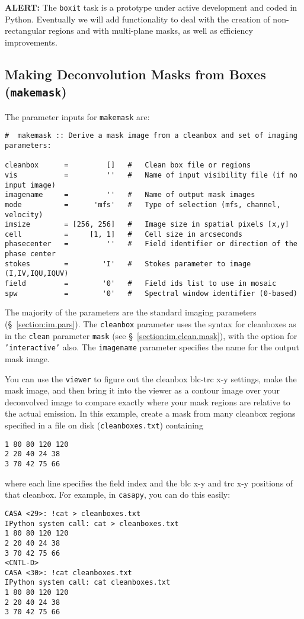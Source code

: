 {\bf ALERT:} The {\tt boxit} task is a prototype under active development and
coded in Python. Eventually we will add functionality to deal with the creation of
non-rectangular regions and with multi-plane masks, as well as efficiency
improvements.  %

\subsection{Making Deconvolution Masks from Boxes ({\tt makemask})}
\label{section:im.mask.makemask}

The parameter inputs for {\tt makemask} are:
\small
\begin{verbatim}
#  makemask :: Derive a mask image from a cleanbox and set of imaging parameters:

cleanbox      =         []   #   Clean box file or regions
vis           =         ''   #   Name of input visibility file (if no input image)
imagename     =         ''   #   Name of output mask images
mode          =      'mfs'   #   Type of selection (mfs, channel, velocity)
imsize        = [256, 256]   #   Image size in spatial pixels [x,y]
cell          =     [1, 1]   #   Cell size in arcseconds
phasecenter   =         ''   #   Field identifier or direction of the phase center
stokes        =        'I'   #   Stokes parameter to image (I,IV,IQU,IQUV)
field         =        '0'   #   Field ids list to use in mosaic
spw           =        '0'   #   Spectral window identifier (0-based)
\end{verbatim}
\normalsize 
The majority of the parameters are the standard imaging parameters
(\S~\ref{section:im.pars}).  The {\tt cleanbox} parameter uses the
syntax for cleanboxes as in the {\tt clean} parameter {\tt mask} (see
\S~\ref{section:im.clean.mask}), with the option for {\tt 'interactive'}
also.  The {\tt imagename} parameter specifies the name
for the output mask image.

You can use the {\tt viewer} to figure out the cleanbox blc-trc x-y
settings, make the mask image, and then bring it into the viewer as a
contour image over your deconvolved image to compare exactly where
your mask regions are relative to the actual emission.  In this
example, create a mask from many cleanbox regions specified in a file
on disk ({\tt cleanboxes.txt}) containing
\small
\begin{verbatim}
1 80 80 120 120
2 20 40 24 38
3 70 42 75 66
\end{verbatim}
\normalsize
where each line specifies the field index and the blc x-y and trc x-y
positions of that cleanbox.  For example, in {\tt casapy}, you can do
this easily:
\small
\begin{verbatim}
CASA <29>: !cat > cleanboxes.txt
IPython system call: cat > cleanboxes.txt
1 80 80 120 120
2 20 40 24 38
3 70 42 75 66
<CNTL-D>
CASA <30>: !cat cleanboxes.txt
IPython system call: cat cleanboxes.txt
1 80 80 120 120
2 20 40 24 38
3 70 42 75 66
\end{verbatim}
\normalsize

